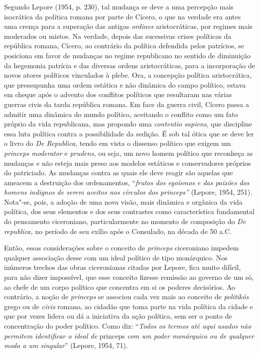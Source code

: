 Segundo Lepore (1954, p. 230), tal mudança se deve a uma percepção mais
isocrática da política romana por parte de Cícero, o que na verdade era
antes uma crença para a superação das antigas \emph{ordines}
aristocráticas, por regimes mais moderados ou mistos. Na verdade, depois
das sucessivas crises políticas da república romana, Cícero, ao
contrário da política defendida pelos patrícios, se posiciona em favor
de mudanças no regime republicano no sentido de diminuição da hegemonia
patrícia e das diversas ordens aristocráticas, para a incorporação de
novos atores políticos vinculados à plebe. Ora, a concepção política
aristocrática, que pressupunha uma ordem estática e não dinâmica do
campo político, estava em cheque após o advento dos conflitos políticos
que resultaram nas várias guerras civis da tarda república romana. Em
face da guerra civil, Cícero passa a admitir uma dinâmica do mundo
político, aceitando o conflito como um fato próprio da vida republicana,
mas propondo uma \emph{contentio sapiens}, que discipline essa luta
política contra a possibilidade da sedição. É sob tal ótica que se deve
ler o livro  do \emph{De Republica}, tendo em vista o dissenso
político que exigem um \emph{princeps moderator} e \emph{prudens,} ou
seja, um novo homem político que reconheça as mudanças e não esteja mais
preso aos modelos estáticos e conservadores próprios do patriciado. As
mudanças contra as quais ele deve reagir são aquelas que ameacem a
destruição dos ordenamentos, ``\emph{frutos dos egoísmos e das paixões
dos homens indignos de serem aceitos nos círculos dos princeps''}
(Lepore, 1954, 251). Nota"-se, pois, a adoção de uma nova visão, mais
dinâmica e orgânica da vida política, dos seus elementos e dos seus
contrastes como característica fundamental do pensamento ciceroniano,
particularmente no momento de composição do \emph{De republica,} no
período de seu exílio após o Consulado, na década de 50 a.C.

Então, essas considerações sobre o conceito de \emph{princeps}
ciceroniano impedem qualquer associação desse com um ideal político de
tipo monárquico. Nos inúmeros trechos das obras ciceronianas citadas por
Lepore, fica muito difícil, para não dizer impossível, que esse conceito
fizesse remissão ao governo de um só, ao chefe de um corpo político que
concentra em si os poderes decisórios. Ao contrário, a noção de
\emph{princeps} se associou cada vez mais ao conceito de
\emph{politikós} grego ou de \emph{civis} romano, ao cidadão que toma
parte na vida política da cidade e que por vezes lidera ou dá a
iniciativa da ação política, sem ser o ponto de concentração do poder
político. Como diz: ``\emph{Todos os termos até aqui usados não permitem
identificar o ideal de} princeps \emph{com um poder monárquico ou de
qualquer modo a um singular}'' (Lepore, 1954, 71).

